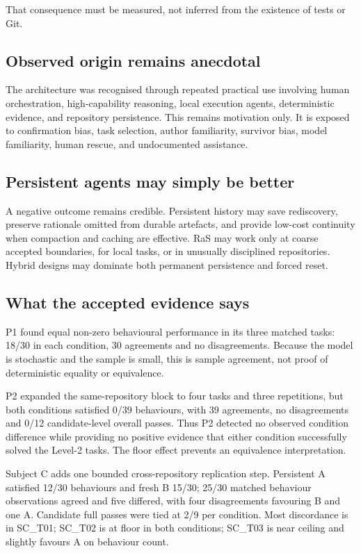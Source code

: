 That consequence must be measured, not inferred from the existence of tests or Git.

\subsection{Observed origin remains anecdotal}

The architecture was recognised through repeated practical use involving human orchestration, high-capability reasoning, local execution agents, deterministic evidence, and repository persistence. This remains motivation only. It is exposed to confirmation bias, task selection, author familiarity, survivor bias, model familiarity, human rescue, and undocumented assistance.

\subsection{Persistent agents may simply be better}

A negative outcome remains credible. Persistent history may save rediscovery, preserve rationale omitted from durable artefacts, and provide low-cost continuity when compaction and caching are effective. RaS may work only at coarse accepted boundaries, for local tasks, or in unusually disciplined repositories. Hybrid designs may dominate both permanent persistence and forced reset.

\subsection{What the accepted evidence says}

P1 found equal non-zero behavioural performance in its three matched tasks: 18/30 in each condition, 30 agreements and no disagreements. Because the model is stochastic and the sample is small, this is sample agreement, not proof of deterministic equality or equivalence.

P2 expanded the same-repository block to four tasks and three repetitions, but both conditions satisfied 0/39 behaviours, with 39 agreements, no disagreements and 0/12 candidate-level overall passes. Thus P2 detected no observed condition difference while providing no positive evidence that either condition successfully solved the Level-2 tasks. The floor effect prevents an equivalence interpretation.

Subject C adds one bounded cross-repository replication step. Persistent A satisfied 12/30 behaviours and fresh B 15/30; 25/30 matched behaviour observations agreed and five differed, with four disagreements favouring B and one A. Candidate full passes were tied at 2/9 per condition. Most discordance is in SC\_T01; SC\_T02 is at floor in both conditions; SC\_T03 is near ceiling and slightly favours A on behaviour count.


